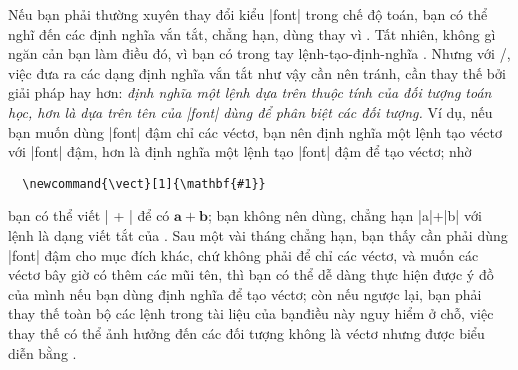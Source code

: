 \documentclass[11pt,leqno,titlepage,openany,oneside]{amsldoc}[1999/12/13]
\newcommand{\vect}[1]{\mathbf{#1}}
\begin{document}
Nếu bạn phải thường xuyên thay đổi kiểu |font| trong chế độ toán,
bạn có thể nghĩ đến các định nghĩa vắn tắt, chẳng hạn, dùng 
thay vì . Tất nhiên, không gì ngăn cản bạn làm điều đó,
vì bạn có trong tay lệnh-tạo-định-nghĩa . Nhưng với \latex/,
việc đưa ra các dạng định nghĩa vắn tắt như vậy cần nên tránh, cần thay thế
bởi giải pháp hay hơn: \emph{định nghĩa một lệnh dựa trên \emph{thuộc tính của
đối tượng toán học}, hơn là dựa trên tên của |font| dùng để phân biệt
các đối tượng.} Ví dụ, nếu bạn muốn dùng |font| đậm chỉ các véctơ, bạn
nên định nghĩa một lệnh tạo véctơ với |font| đậm, hơn là định nghĩa một
lệnh tạo |font| đậm để tạo véctơ; nhờ

\medskip
\begin{verbatim}
  \newcommand{\vect}[1]{\mathbf{#1}}
\end{verbatim}

\medskip\noindent
bạn có thể viết |\vect{a} + \vect{b}| để có $\vect{a}+\vect{b}$;
bạn không nên dùng, chẳng hạn |{a}|+|{b}| với lệnh 
là dạng viết tắt của .
Sau một vài tháng chẳng hạn, bạn thấy cần phải dùng |font| đậm cho mục đích khác,
chứ không phải để chỉ các véctơ, và muốn các véctơ bây giờ có thêm các mũi tên,
thì bạn có thể dễ dàng thực hiện được ý đồ của mình nếu bạn dùng định nghĩa
 để tạo véctơ; còn nếu ngược lại, bạn phải thay thế toàn bộ các lệnh
 trong tài liệu của bạn\mdash điều này nguy hiểm ở chỗ, việc thay thế
có thể ảnh hưởng đến các đối tượng không là véctơ nhưng được biểu diễn bằng
.
\end{document}
